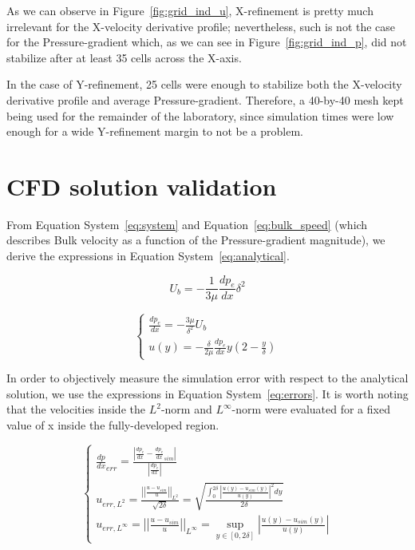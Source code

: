 \documentclass[12pt]{article}
\begin{document}
        As we can observe in Figure~\ref{fig:grid_ind_u}, X-refinement is pretty much irrelevant for the X-velocity derivative profile; nevertheless, such is not the case for the Pressure-gradient which, as we can see in Figure~\ref{fig:grid_ind_p}, did not stabilize after at least 35 cells across the X-axis.

        In the case of Y-refinement, 25 cells were enough to stabilize both the X-velocity derivative profile and average Pressure-gradient. Therefore, a 40-by-40 mesh kept being used for the remainder of the laboratory, since simulation times were low enough for a wide Y-refinement margin to not be a problem.

\section{CFD solution validation} \label{sec:CFD_validation}

        From Equation System~\ref{eq:system} and Equation~\ref{eq:bulk_speed} (which describes Bulk velocity as a function of the Pressure-gradient magnitude), we derive the expressions in Equation System~\ref{eq:analytical}.

        \begin{equation} \label{eq:bulk_speed}
                U_b = - \frac{1}{3 \mu} \frac{dp_e}{dx} \delta ^ 2 
        \end{equation}

        \begin{equation} \label{eq:analytical}
                \begin{cases}
                        \frac{dp_e}{dx} = - \frac{3 \mu}{\delta ^ 2} U_b \\
                        u(y) = - \frac{\delta}{2 \mu} \frac{dp_e}{dx} y (2 - \frac{y}{\delta})
                \end{cases}
        \end{equation}

        In order to objectively measure the simulation error with respect to the analytical solution, we use the expressions in Equation System~\ref{eq:errors}. It is worth noting that the velocities inside the $ L^2 $-norm and $ L^{\infty} $-norm were evaluated for a fixed value of x inside the fully-developed region.

        \begin{equation} \label{eq:errors}
                \begin{cases}
                        \frac{dp}{dx}_{err} = \frac{\left| \frac{dp_e}{dx} - \frac{dp_e}{dx}_{sim} \right|}{\left| \frac{dp_e}{dx} \right|} \\
                        u_{err, L^2} = \frac{\left| \left| \frac{u - u_{sim}}{u} \right| \right|_{L ^ 2}}{\sqrt{2 \delta}} = \sqrt{\frac{\int_{0}^{2 \delta} \left| \frac{u(y) - u_{sim}(y)}{u(y)} \right|^2 dy}{2 \delta}} \\
                        u_{err, L^{\infty}} = \left| \left| \frac{u - u_{sim}}{u} \right| \right|_{L ^ \infty} = \sup_{y \in [0, 2 \delta]} \left| \frac{u(y) - u_{sim}(y)}{u(y)} \right|
                \end{cases}
        \end{equation}
\end{document}
